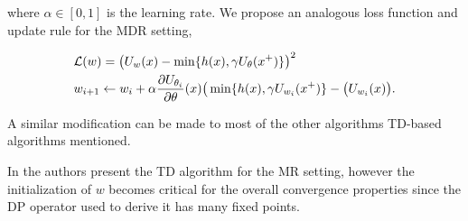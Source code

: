 \noindent where $\alpha \in [0,1]$ is the learning rate. We propose an analogous loss function and update rule for the MDR setting,

\begin{equation}
\begin{split}
&\mathcal{L}(w)=\big(U_{w}(x) - \min\{h(x),\gamma U_{\theta}(x^+)\}\big)^2\\
&w_{i+1} \leftarrow w_i + \alpha\frac{\partial U_{\theta_i}}{\partial \theta}(x)\big(\min\{h(x),\gamma U_{w_i}(x^+)\}- \big(U_{w_i}(x)\big).
\end{split}
\end{equation}

A similar modification can be made to most of the other algorithms TD-based algorithms mentioned. 

In \cite{Akametalu2015} the authors present the TD algorithm for the MR setting, however the initialization of $w$ becomes critical for the overall convergence properties since the DP operator used to derive it has many fixed points.



